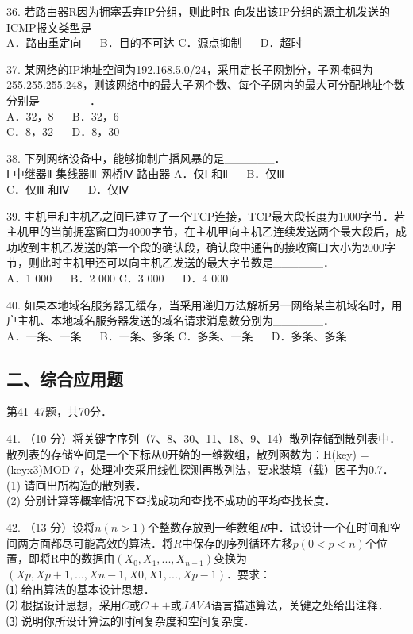 36. 若路由器R因为拥塞丢弃IP分组，则此时R 向发出该IP分组的源主机发送的ICMP报文类型是______ \\
A．路由重定向 $\quad$ B．目的不可达
C．源点抑制 $\quad$ D．超时

37. 某网络的IP地址空间为192.168.5.0/24，采用定长子网划分，子网掩码为255.255.255.248，则该网络中的最大子网个数、每个子网内的最大可分配地址个数分别是______．  \\
A．32，8 $\quad$ B．32，6 \\
C．8，32 $\quad$ D．8，30

38. 下列网络设备中，能够抑制广播风暴的是______． \\
Ⅰ 中继器Ⅱ 集线器Ⅲ 网桥Ⅳ 路由器
A．仅Ⅰ 和Ⅱ $\quad$ B．仅Ⅲ \\
C．仅Ⅲ 和Ⅳ $\quad$ D．仅Ⅳ

39. 主机甲和主机乙之间已建立了一个TCP连接，TCP最大段长度为1000字节．若主机甲的当前拥塞窗口为4000字节，在主机甲向主机乙连续发送两个最大段后，成功收到主机乙发送的第一个段的确认段，确认段中通告的接收窗口大小为2000字节，则此时主机甲还可以向主机乙发送的最大字节数是______． \\
A．1 000 $\quad$ B．2 000
C．3 000 $\quad$ D．4 000

40. 如果本地域名服务器无缓存，当采用递归方法解析另一网络某主机域名时，用户主机、本地域名服务器发送的域名请求消息数分别为______． \\
A．一条、一条 $\quad$ B．一条、多条
C．多条、一条 $\quad$ D．多条、多条

\subsection{二、综合应用题}
第41~47题，共70分．

41. （10 分）将关键字序列（7、8、30、11、18、9、14）散列存储到散列表中．散列表的存储空间是一个下标从0开始的一维数组，散列函数为：H(key) = (keyx3)MOD 7，处理冲突采用线性探测再散列法，要求装填（载）因子为0.7． \\
(1) 请画出所构造的散列表．  \\
(2) 分别计算等概率情况下查找成功和查找不成功的平均查找长度．

42. （13 分）设将$n(n>1)$个整数存放到一维数组$R$中．试设计一个在时间和空间两方面都尽可能高效的算法．将$R$中保存的序列循环左移$p(0<p<n)$个位置，即将R中的数据由$(X_0, X_1, ..., X_{n-1})$变换为$(Xp,Xp+1, ..., Xn-1, X0, X1, ..., Xp-1)$．要求：  \\
⑴ 给出算法的基本设计思想．  \\
⑵ 根据设计思想，采用$C$或$C++$或$JAVA$语言描述算法，关键之处给出注释．  \\
⑶ 说明你所设计算法的时间复杂度和空间复杂度．

